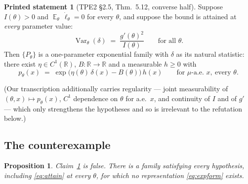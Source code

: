 \documentclass[11pt]{article}
\theoremstyle{plain}
\newtheorem{proposition}[theorem]{Proposition}
\theoremstyle{definition}
\newtheorem{claim}[theorem]{Printed statement}
\theoremstyle{remark}
\DeclareMathOperator{\Var}{Var}
\DeclareMathOperator{\E}{\mathbb{E}}
\newcommand{\R}{\mathbb{R}}
\newcommand{\Pt}{P_\theta}
\newcommand{\score}{\dot\ell_\theta}
\begin{document}
\begin{claim}[TPE2 \S2.5, Thm.~5.12, converse half]\label{claim:attain}
Suppose $I(\theta)>0$ and $\E_\theta\,\score = 0$ for every $\theta$, and suppose the bound
is attained at \emph{every} parameter value:
\begin{equation}\label{eq:attain}
  \Var_\theta(\delta) \;=\; \frac{g'(\theta)^2}{I(\theta)}
  \qquad\text{for all }\theta .
\end{equation}
Then $\{\Pt\}$ is a one-parameter exponential family with $\delta$ as its natural
statistic: there exist $\eta\in C^1(\R)$, $B:\R\to\R$ and a measurable $h\ge 0$ with
\begin{equation}\label{eq:expform}
  p_\theta(x) \;=\; \exp\!\bigl(\eta(\theta)\,\delta(x) - B(\theta)\bigr)\,h(x)
  \qquad \text{for } \mu\text{-a.e. } x,\ \text{every }\theta .
\end{equation}
\end{claim}

(Our transcription additionally carries regularity --- joint measurability of
$(\theta,x)\mapsto p_\theta(x)$, $C^1$ dependence on $\theta$ for a.e.\ $x$, and continuity
of $I$ and of $g'$ --- which only strengthens the hypotheses and so is irrelevant to the
refutation below.)

\subsection{The counterexample}

\begin{proposition}\label{prop:attain-false}
Claim~\ref{claim:attain} is false. There is a family satisfying every hypothesis, including
\eqref{eq:attain} at every $\theta$, for which no representation \eqref{eq:expform} exists.
\end{proposition}
\end{document}
